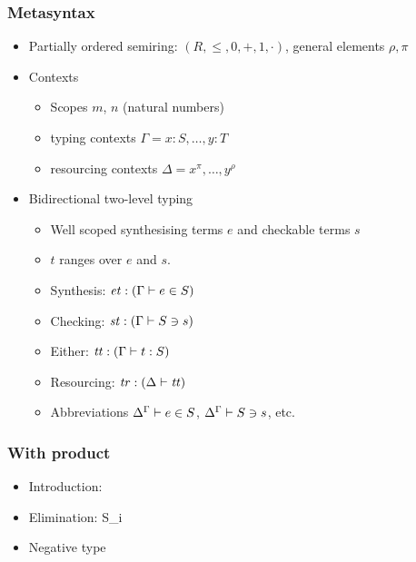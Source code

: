 \documentclass{beamer}
\begin{document}
  \begin{frame}
    \frametitle{Metasyntax}
    \begin{itemize}
    \item Partially ordered semiring: $(R, \leq, 0, +, 1, \cdot)$, general elements $\rho, \pi$ \pause
    \item Contexts
      \begin{itemize}
      \item Scopes $m$, $n$ (natural numbers)
      \item typing contexts $\Gamma = x : S, \ldots, y : T$
      \item resourcing contexts $\Delta = x^\pi, \ldots, y^\rho$ \pause
      \end{itemize}
    \item Bidirectional two-level typing
      \begin{itemize}
      \item Well scoped synthesising terms $e$ and checkable terms $s$
      \item $t$ ranges over $e$ and $s$. \pause
      \item Synthesis: $\mathit{et} : (\Gamma \vdash e \in S)$ \pause
      \item Checking: $\mathit{st} : (\Gamma \vdash S \ni s)$ \pause
      \item Either: $\mathit{tt} : (\Gamma \vdash t : S)$ \pause
      \item Resourcing: $\mathit{tr} : (\Delta \vdash \mathit{tt})$ \pause
      \item Abbreviations ${\Delta}^{\Gamma} \vdash e \in S$,
        ${\Delta}^{\Gamma} \vdash S \ni s$, etc. \pause
      \end{itemize}
    \end{itemize}
  \end{frame}
  \begin{frame}
    \frametitle{With product}
    \begin{itemize}
    \item Introduction:
                {\ctx{\Gamma}{\Delta} \vdash {} \ni {}}
      \bigskip
    \item Elimination:
                {\ctx{\Gamma}{\Delta} \vdash {} \in S_i}
      \bigskip
    \item Negative type
    \end{itemize}
  \end{frame}
\end{document}
